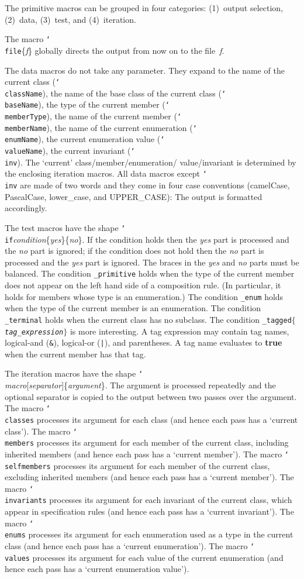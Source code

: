 \documentclass{llncs}
\newcommand{\macro}[1]{\texttt{\char`\\#1}}
\begin{document}
The primitive macros can be grouped in four categories:
(1)~output selection, (2)~data, (3)~test, and (4)~iteration.

The macro \macro{file}\{\thinspace\textit{f}\} globally directs
the output from now on to the file~\textit{f}.

The data macros do not take any parameter. They expand to the
name of the current class (\macro{className}), the name of the
base class of the current class (\macro{baseName}), the type
of the current member (\macro{memberType}), the name of the
current member (\macro{memberName}), the name of the current
enumeration (\macro{enumName}), the current enumeration value
(\macro{valueName}), the current invariant (\macro{inv}).
The `current' class\slash member\slash enumeration\slash
value\slash invariant is determined by the enclosing iteration
macros. All data macros except \macro{inv} are made of two
words and they come in four case conventions (camelCase,
PascalCase, lower\_case, and UPPER\_CASE): The output is
formatted accordingly.

The test macros have the shape
\macro{if}\textit{condition}\{\textit{yes}\}\{\textit{no}\}.
If the condition holds then the \textit{yes} part is processed
and the \textit{no} part is ignored; if the condition does not
hold then the \textit{no} part is processed and the \textit{yes}
part is ignored. The braces in the \textit{yes} and \textit{no}
parts must be balanced. The condition \texttt{\_primitive}
holds when the type of the current member does not appear on
the left hand side of a composition rule. (In particular,
it holds for members whose type is an enumeration.) The
condition \texttt{\_enum} holds when the type of the current
member is an enumeration. The condition \texttt{\_terminal}
holds when the current class has no subclass. The condition
\texttt{\_tagged$\{$\textrm{\textit{tag\_expression}}$\}$}
is more interesting. A tag expression may contain tag names,
logical-and (\texttt{\&}), logical-or (\texttt{|}), and
parentheses. A tag name evaluates to \textbf{true} when the current
member has that tag.

The iteration macros have the shape
\macro{}\textit{macro}[\textit{separator}]\{\textit{argument}\}.
The argument is processed repeatedly and the optional separator
is copied to the output between two passes over the argument. The
macro \macro{classes} processes its argument for each class (and
hence each pass has a `current class'). The macro \macro{members}
processes its argument for each member of the current class,
including inherited members (and hence each pass has a `current
member'). The macro \macro{selfmembers} processes its argument
for each member of the current class, excluding inherited
members (and hence each pass has a `current member'). The macro
\macro{invariants} processes its argument for each invariant of
the current class, which appear in specification rules (and hence
each pass has a `current invariant'). The macro \macro{enums}
processes its argument for each enumeration used as a type in the
current class (and hence each pass has a `current enumeration').
The macro \macro{values} processes its argument for each value
of the current enumeration (and hence each pass has a `current
enumeration value').
\end{document}

